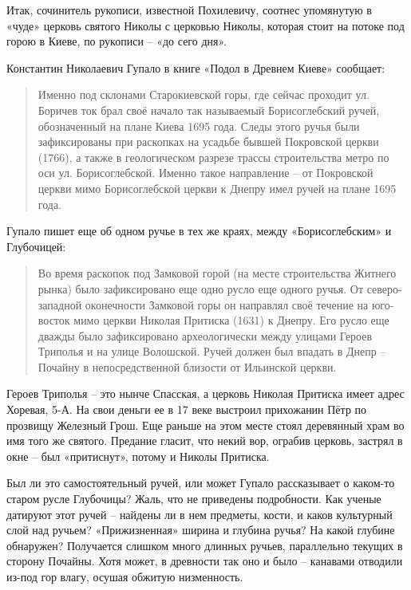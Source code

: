 Итак, сочинитель рукописи, известной Похилевичу, соотнес упомянутую в «чуде» церковь святого Николы с церковью Николы, которая стоит на потоке под горою в Киеве, по рукописи – «до сего дня».

Константин Николаевич Гупало в книге «Подол в Древнем Киеве» сообщает:

\begin{quotation}
Именно под склонами Старокиевской горы, где сейчас проходит ул. Боричев ток брал своё начало так называемый Борисоглебский ручей, обозначенный на плане Киева 1695 года. Следы этого ручья были зафиксированы при раскопках на усадьбе бывшей Покровской церкви (1766), а также в геологическом разрезе трассы строительства метро по оси ул. Борисоглебской. Именно такое направление – от Покровской церкви мимо Борисоглебской церкви к Днепру имел ручей на плане 1695 года.
\end{quotation}

Гупало пишет еще об одном ручье в тех же краях, между «Борисоглебским» и Глубочицей:

\begin{quotation}
Во время раскопок под Замковой горой (на месте строительства Житнего рынка) было зафиксировано еще одно русло еще одного ручья. От северо-западной оконечности Замковой горы он направлял своё течение на юго-восток мимо церкви Николая Притиска (1631) к Днепру. Его русло еще дважды было зафиксировано археологически между улицами Героев Триполья и на улице Волошской. Ручей должен был впадать в Днепр – Почайну в непосредственной близости от Ильинской церкви.
\end{quotation}

Героев Триполья – это нынче Спасская, а церковь Николая Притиска имеет адрес Хоревая, 5-А. На свои деньги ее в 17 веке выстроил прихожанин Пётр по прозвищу Железный Грош. Еще раньше на этом месте стоял деревянный храм во имя того же святого. Предание гласит, что некий вор, ограбив церковь, застрял в окне – был «притиснут», потому и Николы Притиска.

Был ли это самостоятельный ручей, или может Гупало рассказывает о каком-то старом русле Глубочицы? Жаль, что не приведены подробности. Как ученые датируют этот ручей – найдены ли в нем предметы, кости, и каков культурный слой над ручьем? «Прижизненная» ширина и глубина ручья? На какой глубине обнаружен? Получается слишком много длинных ручьев, параллельно текущих в сторону Почайны. Хотя может, в древности так оно и было – канавами отводили из-под гор влагу, осушая обжитую низменность.

